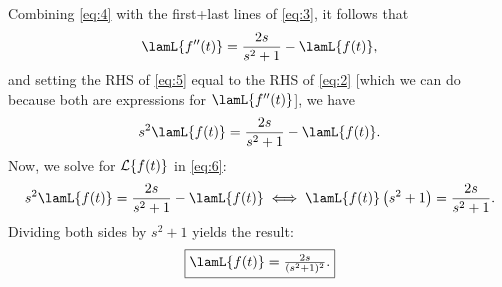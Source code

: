 \documentclass[12pt]{exam}
\begin{document}
	Combining \eqref{eq:4} with the first+last lines of \eqref{eq:3}, it follows that
	\begin{equation}
		\label{eq:5}
		\lamL\{f''(t)\}=\frac{2s}{s^2+1}-\lamL\{f(t)\},
	\end{equation} 
	and setting the RHS of \eqref{eq:5} equal to the RHS of \eqref{eq:2} [which we can do because both are expressions for $\lamL\{f''(t)\}$], we have
	\begin{equation}
		\label{eq:6}
		s^2\lamL\{f(t)\}=\frac{2s}{s^2+1}-\lamL\{f(t)\}.
	\end{equation}
	Now, we solve for $\mathcal{L}\{f(t)\}$ in \eqref{eq:6}:
	\[s^2\lamL\{f(t)\}=\frac{2s}{s^2+1}-\lamL\{f(t)\}\iff\lamL\{f(t)\}\left(s^2+1\right)=\frac{2s}{s^2+1}.\]
	Dividing both sides by $s^2+1$ yields the result:
	\[\fbox{$\lamL\{f(t)\}=\frac{2s}{(s^2+1)^2}.$}\]
\end{document}
